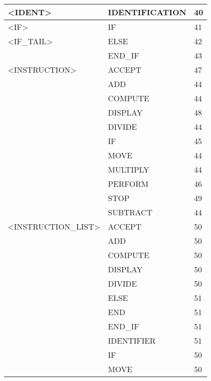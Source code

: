 \begin{longtable}{|l|l|l|}
<IDENT>              &   IDENTIFICATION       &   40 \\ \hline
<IF>                 &   IF                   &   41 \\ \hline
<IF\_TAIL>           &   ELSE                 &   42 \\ \hline
                     &   END\_IF               &   43 \\ \hline
<INSTRUCTION>        &   ACCEPT               &   47 \\ \hline
                     &   ADD                  &   44 \\ \hline
                     &   COMPUTE              &   44 \\ \hline
                     &   DISPLAY              &   48 \\ \hline
                     &   DIVIDE               &   44 \\ \hline
                     &   IF                   &   45 \\ \hline
                     &   MOVE                 &   44 \\ \hline
                     &   MULTIPLY             &   44 \\ \hline
                     &   PERFORM              &   46 \\ \hline
                     &   STOP                 &   49 \\ \hline
                     &   SUBTRACT             &   44 \\ \hline
<INSTRUCTION\_LIST>  &   ACCEPT               &   50 \\ \hline
                     &   ADD                  &   50 \\ \hline
                     &   COMPUTE              &   50 \\ \hline
                     &   DISPLAY              &   50 \\ \hline
                     &   DIVIDE               &   50 \\ \hline
                     &   ELSE                 &   51 \\ \hline
                     &   END                  &   51 \\ \hline
                     &   END\_IF               &   51 \\ \hline
                     &   IDENTIFIER           &   51 \\ \hline
                     &   IF                   &   50 \\ \hline
                     &   MOVE                 &   50 \\ \hline

\end{longtable}
